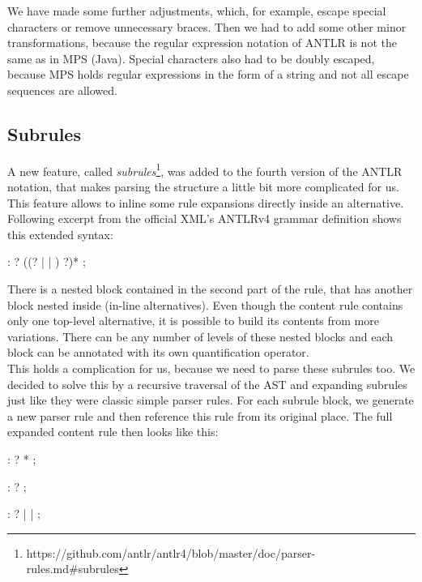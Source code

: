 We have made some further adjustments, which, for example, escape special characters or remove unnecessary braces.
Then we had to add some other minor transformations, because the regular expression notation of ANTLR is not the same as in MPS (Java).
Special characters also had to be doubly escaped, because MPS holds regular expressions in the form of a string and not all escape sequences are allowed.

\subsection{Subrules}
\label{chap:subrules}

A new feature, called \textit{subrules}\footnote{https://github.com/antlr/antlr4/blob/master/doc/parser-rules.md\#subrules}, was added to the fourth version of the ANTLR notation, that makes parsing the structure a little bit more complicated for us.
This feature allows to inline some rule expansions directly inside an alternative.
Following excerpt from the official XML's ANTLRv4 grammar definition shows this extended syntax:

\begin{antlr}
	 :   ? ((? |  | ) ?)* ;
\end{antlr}

There is a nested block contained in the second part of the rule, that has another block nested inside (in-line alternatives).
Even though the content rule contains only one top-level alternative, it is possible to build its contents from more variations.
There can be any number of levels of these nested blocks and each block can be annotated with its own quantification operator.
\\

This holds a complication for us, because we need to parse these subrules too.
We decided to solve this by a recursive traversal of the AST and expanding subrules just like they were classic simple parser rules.
For each subrule block, we generate a new parser rule and then reference this rule from its original place.
The full expanded content rule then looks like this:

\begin{antlr}
	 :   ? * ;

	 :    ? ;

	 :   ?
        |   
        |   
        ;
\end{antlr}
